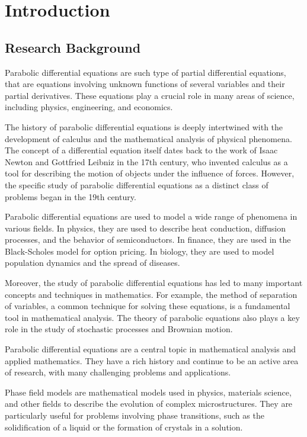 
\chapter{Introduction}




\section{Research Background}
Parabolic differential equations are such type of partial differential equations, 
that are equations involving unknown functions of several variables and their partial derivatives. These equations play a crucial role in many areas of science, including physics, engineering, and economics.

The history of parabolic differential equations is deeply intertwined with the development of calculus and the mathematical analysis of physical phenomena. The concept of a differential equation itself dates back to the work of Isaac Newton and Gottfried Leibniz in the 17th century, who invented calculus as a tool for describing the motion of objects under the influence of forces. However, the specific study of parabolic differential equations as a distinct class of problems began in the 19th century.

Parabolic differential equations are used to model a wide range of phenomena in various fields. In physics, they are used to describe heat conduction, diffusion processes, and the behavior of semiconductors. In finance, they are used in the Black-Scholes model for option pricing. In biology, they are used to model population dynamics and the spread of diseases.

Moreover, the study of parabolic differential equations has led to many important concepts and techniques in mathematics. For example, the method of separation of variables, a common technique for solving these equations, is a fundamental tool in mathematical analysis. The theory of parabolic equations also plays a key role in the study of stochastic processes and Brownian motion.

Parabolic differential equations are a central topic in mathematical analysis and applied mathematics. They have a rich history and continue to be an active area of research, with many challenging problems and applications.

Phase field models are mathematical models used in physics, materials science, and other fields to describe the evolution of complex microstructures. They are particularly useful for problems involving phase transitions, such as the solidification of a liquid or the formation of crystals in a solution.


